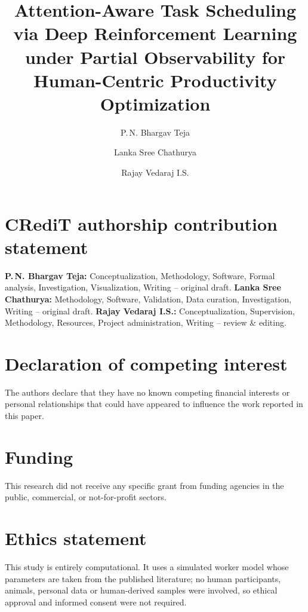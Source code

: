 \documentclass[review,12pt]{elsarticle}
\newcommand{\rev}[1]{{\color{blue}#1}}
\newcommand{\revnote}[1]{\marginpar{\raggedright\scriptsize\color{blue}\textsf{#1}}}
\newcommand{\rev}[1]{#1}
\newcommand{\revnote}[1]{}
\begin{document}
\begin{frontmatter}
\title{Attention-Aware Task Scheduling via Deep Reinforcement Learning under Partial Observability for Human-Centric Productivity Optimization}

\author[vit]{P.\,N. Bhargav Teja}
\author[vit]{Lanka Sree Chathurya}
\author[vit]{Rajay Vedaraj I.S.}


\end{frontmatter}











\section*{CRediT authorship contribution statement}
\textbf{P.\,N. Bhargav Teja:} Conceptualization, Methodology, Software, Formal analysis, Investigation, Visualization, Writing -- original draft. \textbf{Lanka Sree Chathurya:} Methodology, Software, Validation, Data curation, Investigation, Writing -- original draft. \textbf{Rajay Vedaraj I.S.:} Conceptualization, Supervision, Methodology, Resources, Project administration, Writing -- review \& editing.

\section*{Declaration of competing interest}
The authors declare that they have no known competing financial interests or personal relationships that could have appeared to influence the work reported in this paper.

\section*{Funding}
This research did not receive any specific grant from funding agencies in the public, commercial, or not-for-profit sectors.

\section*{Ethics statement}
\rev{\revnote{Ed.}This study is entirely computational. It uses a simulated worker model whose parameters are taken from the published literature; no human participants, animals, personal data or human-derived samples were involved, so ethical approval and informed consent were not required.}
\end{document}
